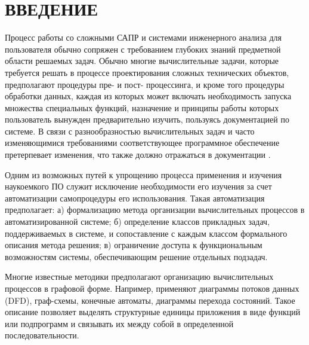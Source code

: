 \chapter*{ВВЕДЕНИЕ}\label{chap.introduction}



Процесс работы со сложными САПР и системами инженерного анализа для пользователя обычно сопряжен с требованием глубоких знаний предметной области решаемых задач. Обычно многие вычислительные задачи, которые требуется решать в процессе проектирования сложных технических объектов, предполагают процедуры пре- и пост- процессинга, и кроме того процедуры обработки данных, каждая из которых может включать необходимость запуска множества специальных функций, назначение и принципы работы которых пользователь вынужден предварительно изучить, пользуясь документацией по системе. В связи с разнообразностью вычислительных задач и часто изменяющимися требованиями соответствующее программное обеспечение претерпевает изменения, что также должно отражаться в документации \cite{SokolovPershin2020}.
\begin{statement}
    Одним из возможных путей к упрощению процесса применения и изучения наукоемкого ПО служит исключение необходимости его изучения за счет автоматизации самопроцедуры его использования. Такая автоматизация предполагает: а) формализацию метода организации вычислительных процессов в автоматизированной системе; б) определение классов прикладных задач, поддерживаемых в системе, и сопоставление с каждым классом формального описания метода решения; в) ограничение доступа к функциональным возможностям системы, обеспечивающим решение отдельных подзадач.\cite{SokolovGolubev2021}
\end{statement}
\begin{statement}
    Многие известные методики предполагают организацию вычислительных процессов в графовой форме. Например, применяют диаграммы потоков данных (DFD), граф-схемы, конечные автоматы, диаграммы перехода состояний. Такое описание позволяет выделять структурные единицы приложения в виде функций или подпрограмм и связывать их между собой в определенной последовательности.
\end{statement}
